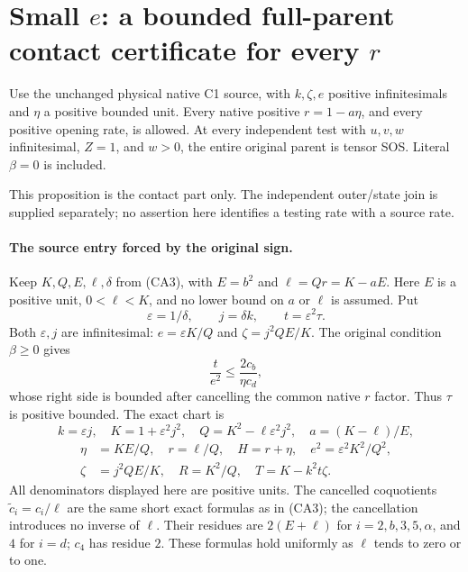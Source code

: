 \section[Small e: a bounded full-parent contact certificate for every r]{Small $e$: a bounded full-parent contact certificate for every $r$}

\begin{proposition}
Use the unchanged physical native C1 source, with $k,\zeta,e$ positive
infinitesimals and $\eta$ a positive bounded unit. Every native positive
$r=1-a\eta$, and every positive opening rate, is allowed.
At every independent test with $u,v,w$ infinitesimal, $Z=1$, and $w>0$,
the entire original parent is tensor SOS. Literal $\beta=0$ is included.
\end{proposition}
This proposition is the contact part only. The independent outer/state
join is supplied separately; no assertion here identifies a testing rate
with a source rate.

\paragraph{The source entry forced by the original sign.}
Keep $K,Q,E,\ell,\delta$ from (CA3), with $E=b^2$ and
$\ell=Qr=K-aE$. Here $E$ is a positive unit, $0<\ell<K$, and no lower
bound on $a$ or $\ell$ is assumed. Put
\[
 \varepsilon=1/\delta,\qquad j=\delta k,\qquad t=\varepsilon^2\tau.
\]
Both $\varepsilon,j$ are infinitesimal: $e=\varepsilon K/Q$ and
$\zeta=j^2QE/K$. The original condition $\beta\ge0$ gives
\[
 \frac{t}{e^2}\le\frac{2c_b}{\eta c_d},
\]
whose right side is bounded after cancelling the common native $r$
factor. Thus $\tau$ is positive bounded. The exact chart is
\[
 k=\varepsilon j,\quad K=1+\varepsilon^2j^2,\quad
 Q=K^2-\ell\varepsilon^2j^2,\quad a=(K-\ell)/E,
\]
\begin{align*}
 \eta&=KE/Q,\quad r=\ell/Q,\quad H=r+\eta,\quad
 e^2=\varepsilon^2K^2/Q^2,\\
 \zeta&=j^2QE/K,\quad R=K^2/Q,\quad T=K-k^2t\zeta. \tag{SE1}
\end{align*}
All denominators displayed here are positive units. The cancelled
coquotients $\widetilde c_i=c_i/\ell$ are the same short exact formulas
as in (CA3); the cancellation introduces no inverse of $\ell$.
Their residues are $2(E+\ell)$ for $i=2,b,3,5,\alpha$, and $4$ for
$i=d$; $c_4$ has residue $2$. These formulas hold uniformly as
$\ell$ tends to zero or to one.

